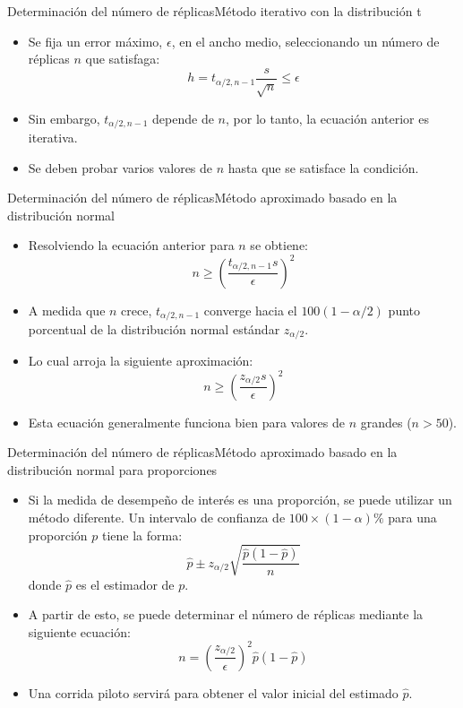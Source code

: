 \begin{frame}{Determinación del número de réplicas}{Método iterativo con la distribución t}
    \begin{itemize}
        
        \item Se fija un error máximo, $\epsilon$, en el ancho medio, seleccionando un número de réplicas $n$ que satisfaga:
        \[h=t_{\alpha/2,n-1}\frac{s}{\sqrt{n}}\leq \epsilon\]
        \item Sin embargo, $t_{\alpha/2,n-1}$ depende de $n$, por lo tanto, la ecuación anterior es iterativa. 
        \item Se deben probar varios valores de $n$ hasta que se satisface la condición.
    \end{itemize}
\end{frame}

\begin{frame}{Determinación del número de réplicas}{Método aproximado basado en la distribución normal}
    \begin{itemize}
        \item Resolviendo la ecuación anterior para $n$ se obtiene:
        \[n\geq \left(\frac{t_{\alpha/2,n-1} s}{\epsilon}\right)^2\]
        \item A medida que $n$ crece, $t_{\alpha/2,n-1}$ converge hacia el $100(1-\alpha/2)$ punto  porcentual de la distribución normal estándar $z_{\alpha/2}$.
        \item Lo cual arroja la siguiente aproximación:
        \[n\geq \left(\frac{z_{\alpha/2} s}{\epsilon}\right)^2\]
        \item Esta ecuación generalmente funciona bien para valores de $n$ grandes ($n>50$).
    \end{itemize}
\end{frame}

\begin{frame}{Determinación del número de réplicas}{Método aproximado basado en la distribución normal para proporciones}
    \begin{itemize}
        \item Si la medida de desempeño de interés es una proporción, se puede utilizar un método diferente. Un intervalo de confianza de $100\times(1-\alpha)\%$ para una proporción $p$ tiene la forma:
        \[\hat{p}\pm z_{\alpha/2} \sqrt{\frac{\hat{p}(1-\hat{p})}{n}}\]
        donde $\hat{p}$ es el estimador de $p$.
        \item A partir de esto, se puede determinar el número de réplicas mediante la siguiente ecuación:
        \[n=\left(\frac{z_{\alpha/2}}{\epsilon}\right)^2 \hat{p}(1-\hat{p})\]
        \item Una corrida piloto servirá para obtener el valor inicial del estimado $\hat{p}$.
    \end{itemize}
\end{frame}

